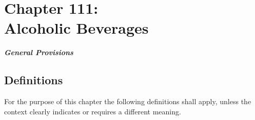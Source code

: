 \chapter*{Chapter 111: \\
	Alcoholic Beverages}
    \minitoc
    \pagebreak

\begin{center}
    \emph{\textbf{\LARGE{General Provisions}}}
\end{center}

\section{Definitions}
For the purpose of this chapter the following definitions shall apply, unless the context clearly indicates or requires a different meaning.

